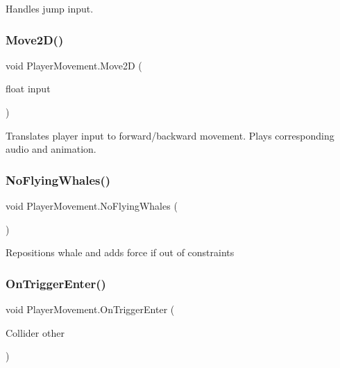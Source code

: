 Handles jump input. 

\mbox{\label{class_player_movement_a14a6dd3ffa26d0ccbf484448b5266b79}} 
\subsubsection{\texorpdfstring{Move2\+D()}{Move2D()}}
{\footnotesize\ttfamily void Player\+Movement.\+Move2D (\begin{DoxyParamCaption}\item[{float}]{input }\end{DoxyParamCaption})}



Translates player input to forward/backward movement. Plays corresponding audio and animation. 

\mbox{\label{class_player_movement_a49aa6a80bb76113ff3702536ea1b46de}} 
\subsubsection{\texorpdfstring{No\+Flying\+Whales()}{NoFlyingWhales()}}
{\footnotesize\ttfamily void Player\+Movement.\+No\+Flying\+Whales (\begin{DoxyParamCaption}{ }\end{DoxyParamCaption})\hspace{0.3cm}{\ttfamily [private]}}



Repositions whale and adds force if out of constraints 

\mbox{\label{class_player_movement_a0d2a1162c4cc3a5d4be939d00368c6e3}} 
\subsubsection{\texorpdfstring{On\+Trigger\+Enter()}{OnTriggerEnter()}}
{\footnotesize\ttfamily void Player\+Movement.\+On\+Trigger\+Enter (\begin{DoxyParamCaption}\item[{Collider}]{other }\end{DoxyParamCaption})\hspace{0.3cm}{\ttfamily [private]}}



